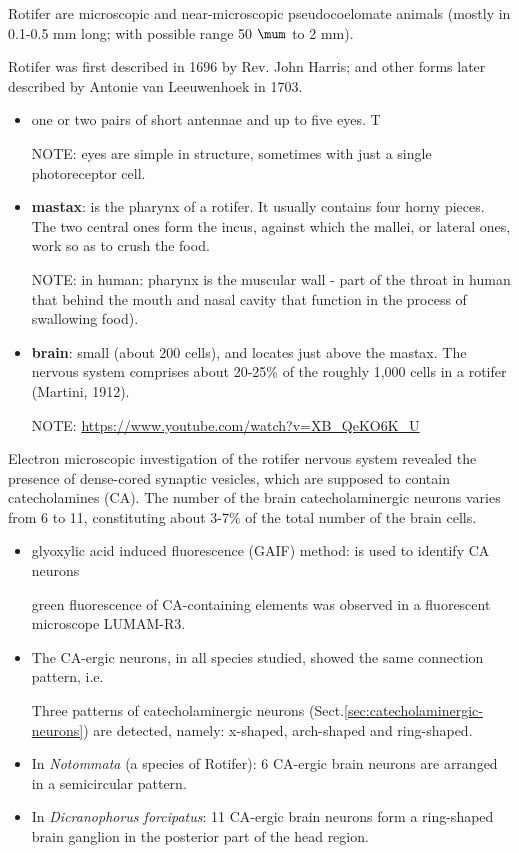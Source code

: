 Rotifer are microscopic and near-microscopic pseudocoelomate animals
(mostly in 0.1-0.5 mm long; with possible range 50 $\mum$ to 2 mm).

Rotifer was first described in 1696 by  Rev. John Harris; and other forms later
described by  Antonie van Leeuwenhoek in 1703.
\begin{itemize}

  \item one or two pairs of short antennae and up to five eyes. T
  
NOTE: eyes are simple in structure, sometimes with just a single photoreceptor
cell.
  
  \item  {\bf mastax}: is the pharynx of a rotifer.
  It usually contains four horny pieces.  The two central ones form the incus,
  against which the mallei, or lateral ones, work so as to crush the food.
  
NOTE: in human: pharynx is the muscular wall - part of the throat in human that
behind the mouth and nasal cavity that function in the process of swallowing
food). 
  
  \item {\bf brain}: small (about 200 cells), and locates just above the mastax.
  The nervous system comprises about 20-25\% of the roughly 1,000 cells in a
  rotifer (Martini, 1912).
  
NOTE: \url{https://www.youtube.com/watch?v=XB_QeKO6K_U}

\end{itemize}

Electron  microscopic  investigation  of  the  rotifer nervous system revealed
the presence of dense-cored synaptic  vesicles,   which  are  supposed  to
contain catecholamines (CA). The number of the brain catecholaminergic neurons
varies from 6 to 11, constituting about 3-7\% of the total number of the brain
cells.
\begin{itemize} 
  \item  glyoxylic  acid  induced fluorescence (GAIF) method: is used to
  identify CA neurons
  
green fluorescence of CA-containing elements was observed in a fluorescent
microscope LUMAM-R3.

  \item The CA-ergic neurons, in all species studied, showed the same connection
  pattern, i.e. 
  
  Three patterns of catecholaminergic neurons
(Sect.\ref{sec:catecholaminergic-neurons}) are detected, namely: x-shaped,
arch-shaped and ring-shaped. 
  
  \item In {\it Notommata} (a species of Rotifer): 6 CA-ergic brain neurons are
  arranged in a semicircular pattern.

  \item In {\it Dicranophorus forcipatus}: 
  11 CA-ergic brain neurons form  a  ring-shaped  brain ganglion in  the
  posterior part of the head region.
  
   
\end{itemize}

